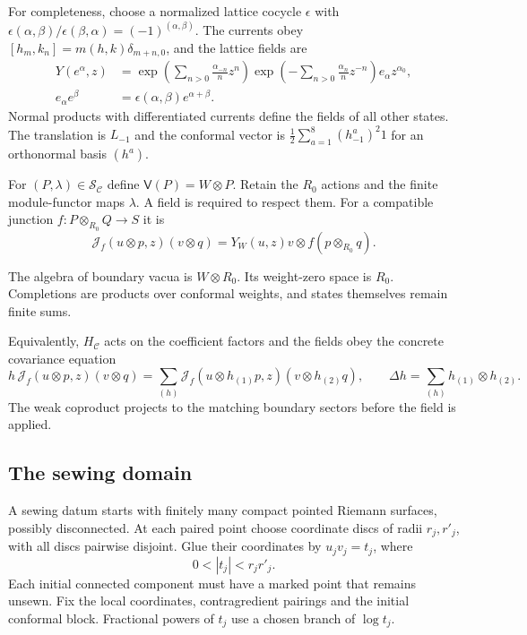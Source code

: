 For completeness, choose a normalized lattice cocycle $\epsilon$ with
$\epsilon(\alpha,\beta)/\epsilon(\beta,\alpha)=(-1)^{(\alpha,\beta)}$.
The currents obey
$[h_m,k_n]=m(h,k)\delta_{m+n,0}$, and the lattice fields are
\[
 \begin{aligned}
 Y(e^\alpha,z)
 &=\exp\left(\sum_{n>0}\frac{\alpha_{-n}}n z^n\right)
   \exp\left(-\sum_{n>0}\frac{\alpha_n}n z^{-n}\right)
   e_\alpha z^{\alpha_0},\\
 e_\alpha e^\beta&=\epsilon(\alpha,\beta)e^{\alpha+\beta}.
 \end{aligned}
\]
Normal products with differentiated currents define the fields of all
other states. The translation is $L_{-1}$ and the conformal vector is
$\frac12\sum_{a=1}^8(h^a_{-1})^2 1$ for an orthonormal basis $(h^a)$.

For $(P,\lambda)\in\mathcal S_{\mathcal C}$ define
$\mathsf V(P)=W\otimes P$. Retain the $R_0$ actions and the finite
module-functor maps $\lambda$. A field is required to respect them.
For a compatible junction $f:P\otimes_{R_0}Q\to S$ it is
\begin{equation}\label{v4-arith:asi:finite-analytic-field}
 \mathcal J_f(u\otimes p,z)(v\otimes q)
       =Y_W(u,z)v\otimes f(p\otimes_{R_0}q).
\end{equation}


The algebra of boundary vacua is $W\otimes R_0$. Its weight-zero
space is $R_0$. Completions are products over conformal weights,
and states themselves remain finite sums.

Equivalently, $H_{\mathcal C}$ acts on the coefficient factors and the
fields obey the concrete covariance equation
\[
 h\,\mathcal J_f(u\otimes p,z)(v\otimes q)
 =\sum_{(h)}\mathcal J_f(u\otimes h_{(1)}p,z)
                           (v\otimes h_{(2)}q),
 \qquad \Delta h=\sum_{(h)}h_{(1)}\otimes h_{(2)}.
\]
The weak coproduct projects to the matching boundary sectors before
the field is applied.

\subsection{The sewing domain}
\label{v4-arith:asi:sewing-domain}

A sewing datum starts with finitely many compact pointed Riemann
surfaces, possibly disconnected. At each paired point choose
coordinate discs of radii \(r_j,r'_j\), with all discs pairwise
disjoint. Glue their coordinates by \(u_jv_j=t_j\), where
\[
 0<|t_j|<r_jr'_j.
\]
Each initial connected component must have a marked point that
remains unsewn. Fix the local coordinates, contragredient pairings
and the initial conformal block. Fractional powers of \(t_j\)
use a chosen branch of \(\log t_j\).

